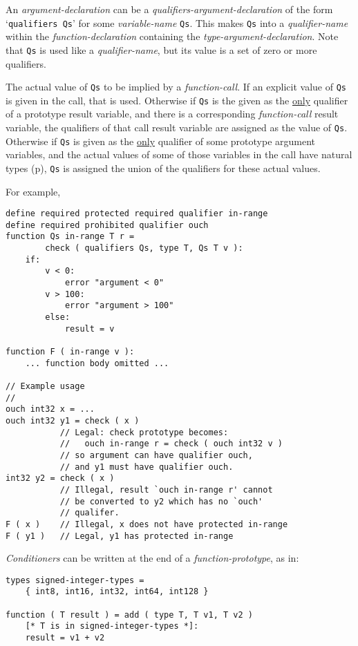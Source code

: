 \documentclass[12pt]{article}
\newcommand{\pagref}[1]{p\pageref{#1}}
\newenvironment{indpar}[1][0.3in]%
	{\begin{list}{}%
		     {\setlength{\itemsep}{0in}%
		      \setlength{\topsep}{0in}%
		      \setlength{\parsep}{1ex}%
		      \setlength{\labelwidth}{#1}%
		      \setlength{\leftmargin}{#1}%
		      \addtolength{\leftmargin}{\labelsep}}%
	 \item}%
	{\end{list}}
\begin{document}
An {\em argument-declaration} can be a {\em qualifiers-argument-declaration}
of the form `{\tt qualifiers Qs}' for some {\em variable-name} {\tt Qs}.
This makes {\tt Qs} into a {\em qualifier-name}
within the {\em function-de\-clar\-a\-tion}
containing the {\em type-argument-declaration}.  Note that {\tt Qs}
is used like a {\em qualifier-name}, but its value is a set of
zero or more qualifiers.

The actual value of {\tt Qs} to be implied by a {\em function-call}.
If an explicit value of {\tt Qs} is given in the call, that is used.
Otherwise if {\tt Qs} is the given as the \underline{only} qualifier
of a prototype result variable, and there is a corresponding {\em function-call}
result variable, the qualifiers of that call result variable are
assigned as the value of {\tt Qs}.  Otherwise
if {\tt Qs} is given as the \underline{only} qualifier
of some prototype argument variables,
and the actual values of some of those variables in the call have
natural types (\pagref{NATURAL-TYPE}), {\tt Qs} is assigned the union
of the qualifiers for these actual values.


For example,
\begin{indpar}\begin{verbatim}
define required protected required qualifier in-range
define required prohibited qualifier ouch
function Qs in-range T r =
        check ( qualifiers Qs, type T, Qs T v ):
    if:
        v < 0:
            error "argument < 0"
        v > 100:
            error "argument > 100"
        else:
            result = v

function F ( in-range v ):
    ... function body omitted ...

// Example usage
//
ouch int32 x = ...
ouch int32 y1 = check ( x )
           // Legal: check prototype becomes:
           //   ouch in-range r = check ( ouch int32 v )
           // so argument can have qualifier ouch,
           // and y1 must have qualifier ouch.
int32 y2 = check ( x )
           // Illegal, result `ouch in-range r' cannot
           // be converted to y2 which has no `ouch'
           // qualifer.
F ( x )    // Illegal, x does not have protected in-range
F ( y1 )   // Legal, y1 has protected in-range
\end{verbatim}\end{indpar}

{\em Conditioners} can be written at the end of a {\em function-prototype},
as in:
\begin{indpar}\begin{verbatim}
types signed-integer-types =
    { int8, int16, int32, int64, int128 }

function ( T result ) = add ( type T, T v1, T v2 )
    [* T is in signed-integer-types *]:
    result = v1 + v2
\end{verbatim}\end{indpar}
\end{document}
